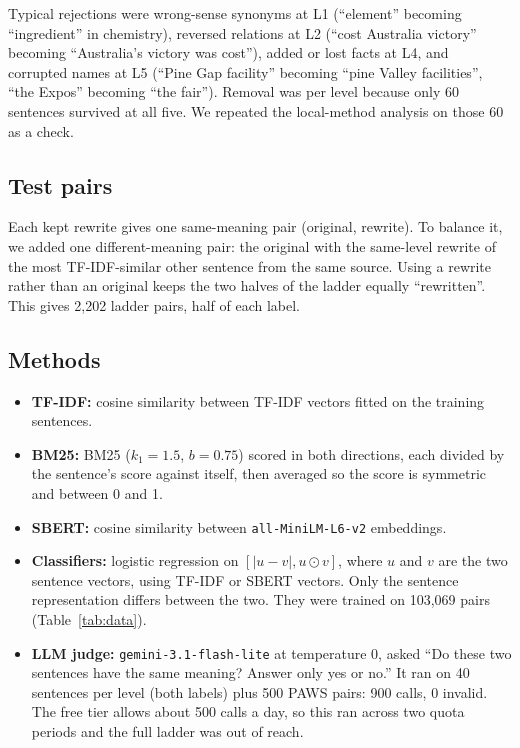 \documentclass[11pt]{article}
\begin{document}
Typical rejections were wrong-sense synonyms at L1 (“element” becoming “ingredient” in chemistry), reversed relations at L2 (“cost Australia victory” becoming “Australia's victory was cost”), added or lost facts at L4, and corrupted names at L5 (“Pine Gap facility” becoming “pine Valley facilities”, “the Expos” becoming “the fair”). Removal was per level because only 60 sentences survived at all five. We repeated the local-method analysis on those 60 as a check.

\subsection{Test pairs}
Each kept rewrite gives one same-meaning pair (original, rewrite). To balance it, we added one different-meaning pair: the original with the same-level rewrite of the most TF-IDF-similar other sentence from the same source. Using a rewrite rather than an original keeps the two halves of the ladder equally “rewritten”. This gives 2,202 ladder pairs, half of each label.

\subsection{Methods}
\begin{itemize}\setlength{\itemsep}{1pt}\setlength{\parskip}{0pt}
\item \textbf{TF-IDF:} cosine similarity between TF-IDF vectors fitted on the training sentences.
\item \textbf{BM25:} BM25 ($k_1 = 1.5$, $b = 0.75$) scored in both directions, each divided by the sentence's score against itself, then averaged so the score is symmetric and between 0 and 1.
\item \textbf{SBERT:} cosine similarity between \texttt{all-MiniLM-L6-v2} embeddings.
\item \textbf{Classifiers:} logistic regression on $[|u-v|, u \odot v]$, where $u$ and $v$ are the two sentence vectors, using TF-IDF or SBERT vectors. Only the sentence representation differs between the two. They were trained on 103,069 pairs (Table~\ref{tab:data}).
\item \textbf{LLM judge:} \texttt{gemini-3.1-flash-lite} at temperature 0, asked “Do these two sentences have the same meaning? Answer only yes or no.” It ran on 40 sentences per level (both labels) plus 500 PAWS pairs: 900 calls, 0 invalid. The free tier allows about 500 calls a day, so this ran across two quota periods and the full ladder was out of reach.
\end{itemize}
\end{document}
